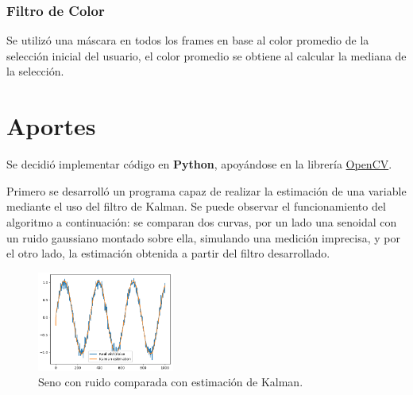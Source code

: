 \subsubsection{Filtro de Color}
Se utilizó una máscara en todos los frames en base al color promedio de la selección inicial del usuario, el color promedio se obtiene al calcular la mediana de la selección.
 
\section{Aportes}

Se decidió implementar código en \textbf{Python}, apoyándose en la librería \href{https://opencv.org/}{OpenCV}.

Primero se desarrolló un programa capaz de realizar la estimación de una variable mediante el uso del filtro de Kalman. Se puede observar el funcionamiento del algoritmo a continuación: se comparan dos curvas, por un lado una senoidal con un ruido gaussiano montado sobre ella, simulando una medición imprecisa, y por el otro lado, la estimación obtenida a partir del filtro desarrollado.
\begin{figure}[H]
\centering
	\includegraphics[width=0.4\textwidth]{Imagenes/Kalman_test_1.png}
	\caption{Seno con ruido comparada con estimación de Kalman.}
	\label{fig:kalman-comp}
\end{figure}

